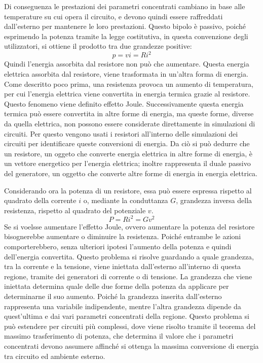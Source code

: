 \documentclass{article}
\numberwithin{equation}{subsection}
\begin{document}
Di conseguenza le prestazioni dei parametri concentrati cambiano in base alle temperature su cui opera il circuito, e devono quindi essere raffreddati dall'esterno per mantenere 
le loro prestazioni. Questo bipolo è passivo, poiché esprimendo la potenza tramite la legge costitutiva, in questa convenzione degli utilizzatori, si ottiene il prodotto 
tra due grandezze positive:
\begin{equation*}
    p=vi=Ri^2
\end{equation*}
Quindi l'energia assorbita dal resistore non può che aumentare. Questa energia elettrica assorbita dal resistore, viene trasformata in un'altra forma di energia. Come 
descritto poco prima, una resistenza provoca un aumento di temperatura, per cui l'energia elettrica viene convertita in energia termica grazie al resistore. Questo fenomeno 
viene definito effetto Joule. Successivamente questa energia termica può essere convertita in altre forme di energia, ma queste forme, diverse da quella elettrica, non possono 
essere considerate direttamente in simulazioni di circuiti. Per questo vengono usati i resistori all'interno delle simulazioni dei circuiti per identificare queste 
conversioni di energia. Da ciò si può dedurre che un resistore, un oggeto che converte energia elettrica in altre forme di energia, è un vettore energetico per l'energia 
elettrica; inoltre rappresenta il duale passivo del generatore, un oggetto che converte altre forme di energia in energia elettrica. 


Considerando ora la potenza di un resistore, essa può essere espressa rispetto al quadrato della corrente $i$ o, mediante la conduttanza $G$, grandezza inversa della resistenza, 
rispetto al quadrato del potenziale $v$. 
\begin{equation*}
    P=Ri^2=Gv^2
\end{equation*}
Se si voelsse aumentare l'effetto Joule, ovvero aumentare la potenza del resistore bisognerebbe aumentare o diminuire la resistenza. Poiché entrambe le azioni comporterebbero, 
senza ulteriori ipotesi l'aumento della potenza e quindi dell'energia convertita. Questo problema si risolve guardando a quale grandezza, tra la corrente e la tensione, 
viene iniettata dall'esterno all'interno di questa regione, tramite dei generatori di corrente o di tensione. La grandezza che viene iniettata determina quale delle due 
forme della potenza da applicare per determinarne il suo aumento. Poiché la grandezza inserita dall'esterno rappresenta una variabile indipendente, mentre l'altra 
grandezza dipende da quest'ultima e dai vari parametri concentrati della regione. Questo problema si può estendere per circuiti più complessi, dove viene risolto tramite 
il teorema del massimo trasferimento di potenza, che determina il valore che i parametri concentrati devono assumere affinché si ottenga la massima conversione di energia 
tra circuito ed ambiente esterno.  
\end{document}

